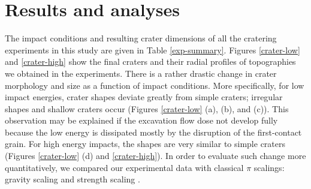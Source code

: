 \documentclass[3p,authoryear]{elsarticle}
\begin{document}
 \section{Results and analyses}\label{sec:classic-pi}
The impact conditions and resulting crater dimensions of all the cratering experiments in this study are given in Table \ref{exp-summary}. Figures \ref{crater-low} and \ref{crater-high} show the final craters and their radial profiles of topographies we obtained in the experiments. There is a rather drastic change in crater morphology and size as a function of impact conditions. More specifically, for low impact energies, crater shapes deviate greatly from simple craters; irregular shapes and shallow craters occur (Figures \ref{crater-low} (a), (b), and (c)). This observation may be explained if the excavation flow dose not develop fully because the low energy is dissipated mostly by the disruption of the first-contact grain. For high energy impacts, the shapes are very similar to simple craters (Figures \ref{crater-low} (d) and \ref{crater-high}). In order to evaluate such change more quantitatively, we compared our experimental data with classical $\pi$ scalings: gravity scaling and strength scaling \citep[e.g.][]{holsapple1993}.
\end{document}
